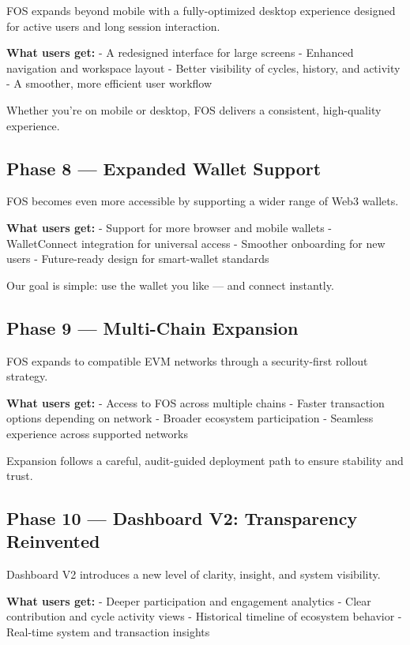 \documentclass[
  10pt,
  letterpaper,
]{article}
\begin{document}
FOS expands beyond mobile with a fully-optimized desktop experience
designed for active users and long session interaction.

\textbf{What users get:} - A redesigned interface for large screens -
Enhanced navigation and workspace layout - Better visibility of cycles,
history, and activity - A smoother, more efficient user workflow

Whether you're on mobile or desktop, FOS delivers a consistent,
high-quality experience.

\subsection{Phase 8 --- Expanded Wallet
Support}\label{phase-8-expanded-wallet-support}

FOS becomes even more accessible by supporting a wider range of Web3
wallets.

\textbf{What users get:} - Support for more browser and mobile wallets -
WalletConnect integration for universal access - Smoother onboarding for
new users - Future-ready design for smart-wallet standards

Our goal is simple: use the wallet you like --- and connect instantly.

\subsection{Phase 9 --- Multi-Chain
Expansion}\label{phase-9-multi-chain-expansion}

FOS expands to compatible EVM networks through a security-first rollout
strategy.

\textbf{What users get:} - Access to FOS across multiple chains - Faster
transaction options depending on network - Broader ecosystem
participation - Seamless experience across supported networks

Expansion follows a careful, audit-guided deployment path to ensure
stability and trust.

\subsection{Phase 10 --- Dashboard V2: Transparency
Reinvented}\label{phase-10-dashboard-v2-transparency-reinvented}

Dashboard V2 introduces a new level of clarity, insight, and system
visibility.

\textbf{What users get:} - Deeper participation and engagement analytics
- Clear contribution and cycle activity views - Historical timeline of
ecosystem behavior - Real-time system and transaction insights
\end{document}
